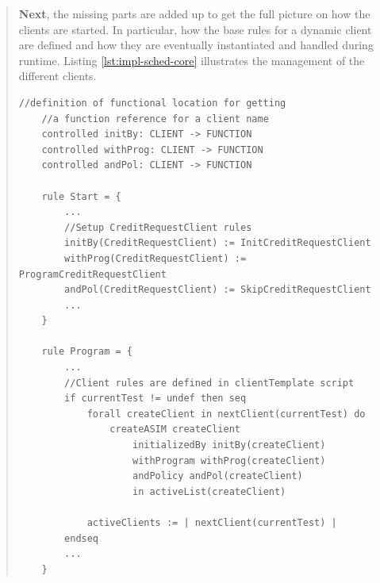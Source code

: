 \begin{quote}
\textbf{Next}, the missing parts are added up to get the full picture on how the clients are started. In particular, how the base rules for a dynamic client are defined and how they are eventually instantiated and handled during runtime. Listing \ref{lst:impl-sched-core} illustrates the management of the different clients.

\begin{center}
\begin{minipage}{0.8\textwidth}
\small
\begin{lstlisting}[language=bsl_lst,caption={\bf\small Scheduler core functionality},label={lst:impl-sched-core} ]
	//definition of functional location for getting
	//a function reference for a client name
	controlled initBy: CLIENT -> FUNCTION
	controlled withProg: CLIENT -> FUNCTION
	controlled andPol: CLIENT -> FUNCTION
	
	rule Start = {
		...
		//Setup CreditRequestClient rules
		initBy(CreditRequestClient) := InitCreditRequestClient
		withProg(CreditRequestClient) := ProgramCreditRequestClient
		andPol(CreditRequestClient) := SkipCreditRequestClient
		...
	}
	
	rule Program = {
		...
		//Client rules are defined in clientTemplate script
		if currentTest != undef then seq			
			forall createClient in nextClient(currentTest) do
				createASIM createClient
					initializedBy initBy(createClient)
					withProgram withProg(createClient)
					andPolicy andPol(createClient)
					in activeList(createClient)
					
			activeClients := | nextClient(currentTest) |
		endseq
		...
	}
\end{lstlisting}
\end{minipage}
\end{center}


\end{quote}
